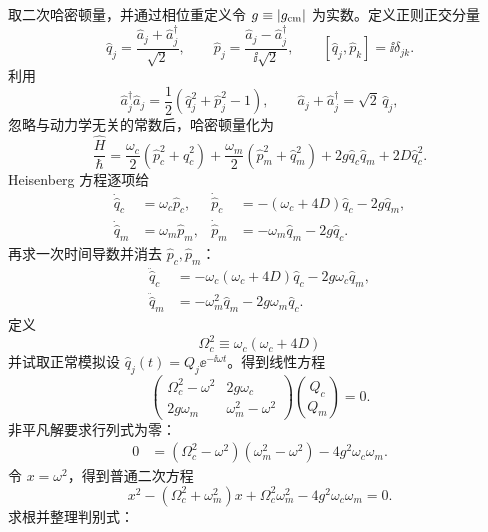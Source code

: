 \begin{exbox}
取二次哈密顿量，并通过相位重定义令 $g\equiv|g_{\rm cm}|$ 为实数。定义正则正交分量
\begin{equation*}
 \hat q_j=\frac{\hat a_j+\hat a_j^\dagger}{\sqrt2},
 \qquad
 \hat p_j=\frac{\hat a_j-\hat a_j^\dagger}{\ii\sqrt2},
 \qquad [\hat q_j,\hat p_k]=\ii\delta_{jk}.
\end{equation*}
利用
\begin{equation*}
 \hat a_j^\dagger\hat a_j=\frac12(\hat q_j^2+\hat p_j^2-1),
 \qquad
 \hat a_j+\hat a_j^\dagger=\sqrt2\,\hat q_j,
\end{equation*}
忽略与动力学无关的常数后，哈密顿量化为
\begin{equation*}
 \frac{\hat H}{\hbar}
 =\frac{\omega_c}{2}(\hat p_c^2+\hat q_c^2)
 +\frac{\omega_m}{2}(\hat p_m^2+\hat q_m^2)
 +2g\hat q_c\hat q_m+2D\hat q_c^2.
\end{equation*}
Heisenberg 方程逐项给
\begin{align*}
 \dot{\hat q}_c&=\omega_c \hat p_c,&
 \dot{\hat p}_c&=-(\omega_c+4D)\hat q_c-2g\hat q_m,\\
 \dot{\hat q}_m&=\omega_m \hat p_m,&
 \dot{\hat p}_m&=-\omega_m \hat q_m-2g\hat q_c.
\end{align*}
再求一次时间导数并消去 $\hat p_c,\hat p_m$：
\begin{align*}
 \ddot{\hat q}_c
 &=-\omega_c(\omega_c+4D)\hat q_c-2g\omega_c \hat q_m,\\
 \ddot{\hat q}_m
 &=-\omega_m^2\hat q_m-2g\omega_m \hat q_c.
\end{align*}
定义
\begin{equation*}
 \Omega_c^2\equiv\omega_c(\omega_c+4D)
\end{equation*}
并试取正常模拟设 $\hat q_j(t)=Q_j \ee^{-\ii\omega t}$。得到线性方程
\begin{equation*}
 \begin{pmatrix}
 \Omega_c^2-\omega^2 & 2g\omega_c\\
 2g\omega_m & \omega_m^2-\omega^2
 \end{pmatrix}
 \binom{Q_c}{Q_m}=0.
\end{equation*}
非平凡解要求行列式为零：
\begin{align*}
 0
 &=(\Omega_c^2-\omega^2)(\omega_m^2-\omega^2)
 -4g^2\omega_c\omega_m.
\end{align*}
令 $x=\omega^2$，得到普通二次方程
\begin{equation*}
 x^2-(\Omega_c^2+\omega_m^2)x
 +\Omega_c^2\omega_m^2-4g^2\omega_c\omega_m=0.
\end{equation*}
求根并整理判别式：
\begin{align*}

\end{align*}
\end{exbox}
